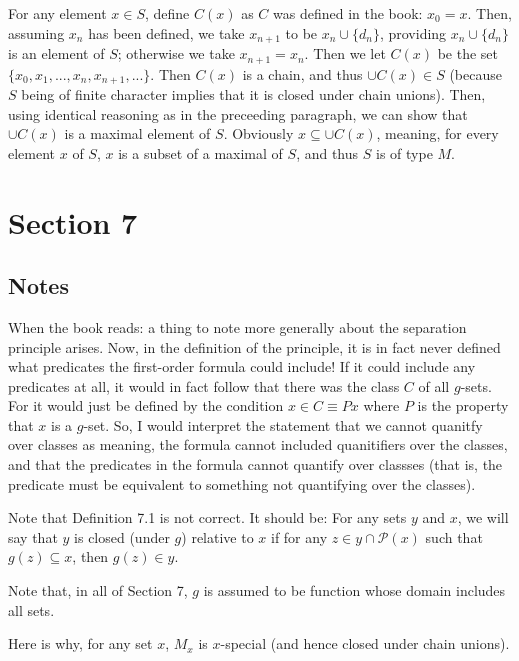 \documentclass{article}
\theoremstyle{definition}
\begin{document}
For any element $x\in S$, define $C(x)$ as $C$ was defined in the book: $x_0=x$. Then, assuming $x_n$ has been defined, we take 
$x_{n+1}$ to be $x_n\cup\{d_n\}$, providing $x_n\cup\{d_n\}$ is an element of $S$; otherwise we take $x_{n+1}=x_n$. Then 
we let $C(x)$ be the set $\{x_0,x_1,...,x_n,x_{n+1},...\}$. Then $C(x)$ is a chain, and thus $\cup C(x)\in S$ (because $S$ being of 
finite character implies that it is closed under chain unions). Then, using identical reasoning as in the preceeding paragraph, we 
can show that $\cup C(x)$ is a maximal element of $S$. Obviously $x\subseteq\cup C(x)$, meaning, for every element $x$ of $S$, 
$x$ is a subset of a maximal of $S$, and thus $S$ is of type $M$. 

\section*{Section 7}

\subsection*{Notes}
When the book reads:  a thing to note more generally about the separation principle arises. Now, in the definition of the principle, 
it is in fact never defined what predicates the first-order formula could include! If it could include any predicates at all, it would in 
fact follow that there was the class $C$ of all $g$-sets. For it would just be defined by the condition $x\in C\equiv Px$ where $P$ is the 
property that $x$ is a $g$-set. So, I would interpret the statement that we cannot quanitfy over classes as meaning, the formula 
cannot included quanitifiers over the classes, and that the predicates in the formula cannot quantify over classses (that is, the 
predicate must be equivalent to something not quantifying over the classes). 

Note that Definition 7.1 is not correct. It should be: For any sets $y$ and $x$, we will say that $y$ is closed (under $g$) relative 
to $x$ if for any $z\in y\cap\mathcal{P}(x)$ such that $g(z)\subseteq x$, then $g(z)\in y$.

Note that, in all of Section 7, $g$ is assumed to be function whose domain includes all sets.

Here is why, for any set $x$, $M_x$ is $x$-special (and hence closed under chain unions). 
\end{document}
